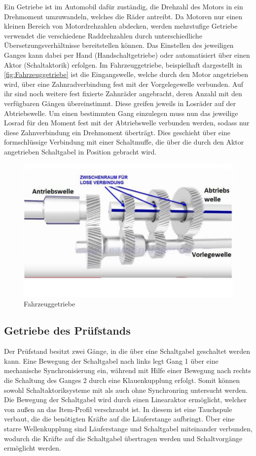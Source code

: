 Ein Getriebe ist im Automobil dafür zuständig, die Drehzahl des Motors in ein Drehmoment umzuwandeln, welches die Räder antreibt. Da Motoren nur einen kleinen Bereich von Motordrehzahlen abdecken, werden mehrstufige Getriebe verwendet die verschiedene Raddrehzahlen durch unterschiedliche Übersetzungsverhältnisse bereitstellen können.  Das Einstellen des jeweiligen Ganges kann dabei per Hand (Handschaltgetriebe) oder automatisiert über einen Aktor (Schaltaktorik) erfolgen. 
Im Fahrzeuggetriebe, beispielhaft dargestellt in \autoref{fig:Fahrzeuggetriebe} ist die Eingangswelle, welche durch den Motor angetrieben wird, über eine Zahnradverbindung  fest mit der  Vorgelegewelle verbunden. Auf ihr sind noch weitere fest fixierte Zahnräder angebracht, deren Anzahl mit den verfügbaren Gängen übereinstimmt. Diese greifen jeweils in Losräder auf der Abtriebswelle. Um einen bestimmten Gang einzulegen muss nun das jeweilige Losrad für den Moment fest mit der Abtriebswelle verbunden werden, sodass nur diese Zahnverbindung ein Drehmoment überträgt. Dies geschieht über eine formschlüssige Verbindung mit einer Schaltmuffe, die über die durch den Aktor angetrieben Schaltgabel in Position gebracht wird.

\begin{figure}[h]
	\centering
		\includegraphics{Bilder/Fahrzeuggetriebe.pdf}
	\caption{Fahrzeuggetriebe}
	\label{fig:Fahrzeuggetriebe}
\end{figure}

\subsection{Getriebe des Prüfstands}

Der Prüfstand besitzt zwei Gänge, in die über eine Schaltgabel geschaltet werden kann. Eine Bewegung der Schaltgabel nach links legt Gang 1 über eine mechanische Synchronisierung ein, während mit Hilfe einer Bewegung nach rechts die Schaltung des Ganges 2 durch eine Klauenkupplung erfolgt. Somit können sowohl Schaltaktoriksysteme mit als auch ohne Synchronring untersucht werden.
Die Bewegung der Schaltgabel wird durch einen Linearaktor ermöglicht, welcher von außen an das Item-Profil verschraubt ist. In diesem ist eine Tauchspule verbaut, die die benötigten Kräfte auf die Läuferstange aufbringt. Über eine starre Wellenkupplung sind Läuferstange und Schaltgabel miteinander verbunden, wodurch die Kräfte auf die Schaltgabel übertragen werden und Schaltvorgänge ermöglicht werden.

